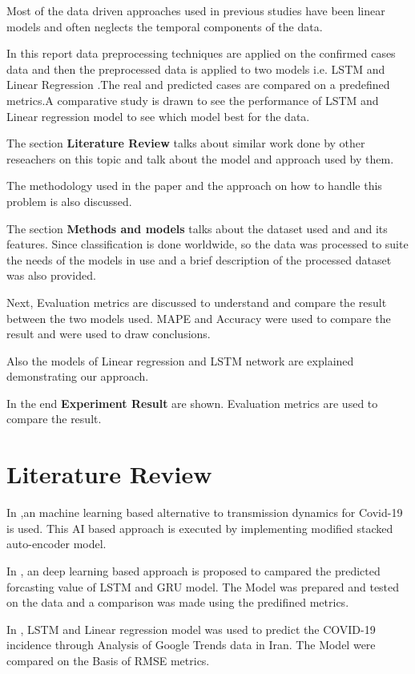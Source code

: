 Most of the data driven approaches used in previous studies
\cite{knight2016bridging} have been linear models and often neglects the
temporal components of the data.


In this report data preprocessing techniques are  applied on the confirmed cases data and then the preprocessed
data is applied to two models i.e. LSTM and Linear Regression .The real and predicted cases are compared on
a predefined metrics.A comparative study is drawn to see the performance of
LSTM and Linear regression model to see which model best for the data.

The section \textbf{Literature Review} talks about similar work done by
other reseachers on this topic and talk about the model and approach used by
them.

The methodology used in the paper and the approach on how to handle this
problem is also discussed.

The section \textbf{Methods and models} talks about the dataset used and and its
features. Since classification is done worldwide, so the data was processed to
suite the needs of the models in use and a brief description of the processed
dataset was also provided.

Next, Evaluation metrics are discussed to understand and compare the result
between the two models used. MAPE and Accuracy were used to compare the result
and were used to draw conclusions.

Also the models of Linear regression and LSTM network are explained
demonstrating our approach.

In the end \textbf{Experiment Result} are shown. Evaluation metrics are used
to compare the result.


\section{Literature Review}

In \cite{hu2020artificial},an machine learning based alternative to
transmission dynamics for Covid-19 is used. This AI based approach is executed by implementing modified stacked
auto-encoder model.

In \cite{bandyopadhyay2020machine}, an deep learning based approach is
proposed to campared the predicted forcasting value of LSTM and GRU model. The
Model was prepared and tested on the data and a comparison was made using the
predifined metrics.

In \cite{ayyoubzadeh2020predicting}, LSTM and Linear regression model was used
to predict the COVID-19 incidence through Analysis of Google Trends data in
Iran. The Model were compared on the Basis of RMSE metrics.

